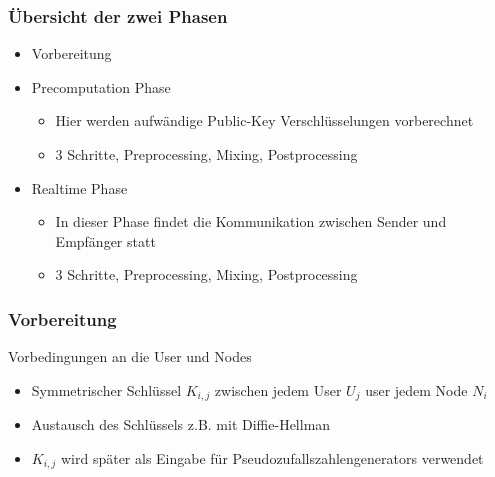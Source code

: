 \documentclass[t, xcolor=dvipsnames]{beamer}
\begin{document}
\begin{frame}
	\frametitle{Übersicht der zwei Phasen}
	\begin{itemize}
		\item Vorbereitung
		\item Precomputation Phase
			\begin{itemize}
				\item Hier werden aufwändige Public-Key Verschlüsselungen vorberechnet
				\item 3 Schritte, Preprocessing, Mixing, Postprocessing
			\end{itemize}
		\item Realtime Phase
			\begin{itemize}
				\item In dieser Phase findet die Kommunikation zwischen Sender und Empfänger statt
				\item 3 Schritte, Preprocessing, Mixing, Postprocessing
			\end{itemize}
	\end{itemize}
	\vspace{\fill}
\end{frame}


\begin{frame}
	\frametitle{Vorbereitung}
 Vorbedingungen an die User und Nodes
			\begin{itemize}
				\item Symmetrischer Schlüssel $K_{i,j}$ zwischen jedem User $U_j$ user jedem Node $N_i$ 
				\item Austausch des Schlüssels z.B. mit Diffie-Hellman
				\item $K_{i,j}$ wird später als Eingabe für Pseudozufallszahlengenerators verwendet
			\end{itemize}
	\vspace{\fill}
\end{frame}
\end{document}
